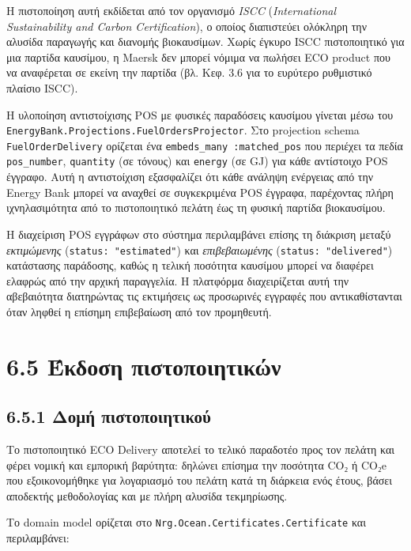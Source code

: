 Η πιστοποίηση αυτή εκδίδεται από τον οργανισμό \emph{ISCC}
(\emph{International Sustainability and Carbon Certification}), ο οποίος
διαπιστεύει ολόκληρη την αλυσίδα παραγωγής και διανομής βιοκαυσίμων.
Χωρίς έγκυρο ISCC πιστοποιητικό για μια παρτίδα καυσίμου, η Maersk δεν
μπορεί νόμιμα να πωλήσει ECO product που να αναφέρεται σε εκείνη την
παρτίδα (βλ. Κεφ. 3.6 για το ευρύτερο ρυθμιστικό πλαίσιο ISCC).

Η υλοποίηση αντιστοίχισης POS με φυσικές παραδόσεις καυσίμου γίνεται
μέσω του \texttt{EnergyBank.Projections.FuelOrdersProjector}. Στο
projection schema \texttt{FuelOrderDelivery} ορίζεται ένα
\texttt{embeds\_many\ :matched\_pos} που περιέχει τα πεδία
\texttt{pos\_number}, \texttt{quantity} (σε τόνους) και \texttt{energy}
(σε GJ) για κάθε αντίστοιχο POS έγγραφο. Αυτή η αντιστοίχιση εξασφαλίζει
ότι κάθε ανάληψη ενέργειας από την Energy Bank μπορεί να αναχθεί σε
συγκεκριμένα POS έγγραφα, παρέχοντας πλήρη ιχνηλασιμότητα από το
πιστοποιητικό πελάτη έως τη φυσική παρτίδα βιοκαυσίμου.

Η διαχείριση POS εγγράφων στο σύστημα περιλαμβάνει επίσης τη διάκριση
μεταξύ \emph{εκτιμώμενης} (\texttt{status:\ "estimated"}) και
\emph{επιβεβαιωμένης} (\texttt{status:\ "delivered"}) κατάστασης
παράδοσης, καθώς η τελική ποσότητα καυσίμου μπορεί να διαφέρει ελαφρώς
από την αρχική παραγγελία. Η πλατφόρμα διαχειρίζεται αυτή την
αβεβαιότητα διατηρώντας τις εκτιμήσεις ως προσωρινές εγγραφές που
αντικαθίστανται όταν ληφθεί η επίσημη επιβεβαίωση από τον προμηθευτή.

\section{6.5 Έκδοση
πιστοποιητικών}\label{ux3adux3baux3b4ux3bfux3c3ux3b7-ux3c0ux3b9ux3c3ux3c4ux3bfux3c0ux3bfux3b9ux3b7ux3c4ux3b9ux3baux3ceux3bd}

\subsection{6.5.1 Δομή
πιστοποιητικού}\label{ux3b4ux3bfux3bcux3ae-ux3c0ux3b9ux3c3ux3c4ux3bfux3c0ux3bfux3b9ux3b7ux3c4ux3b9ux3baux3bfux3cd}

Το πιστοποιητικό ECO Delivery αποτελεί το τελικό παραδοτέο προς τον
πελάτη και φέρει νομική και εμπορική βαρύτητα: δηλώνει επίσημα την
ποσότητα CO₂ ή CO₂e που εξοικονομήθηκε για λογαριασμό του πελάτη κατά τη
διάρκεια ενός έτους, βάσει αποδεκτής μεθοδολογίας και με πλήρη αλυσίδα
τεκμηρίωσης.

Το domain model ορίζεται στο \texttt{Nrg.Ocean.Certificates.Certificate}
και περιλαμβάνει:

